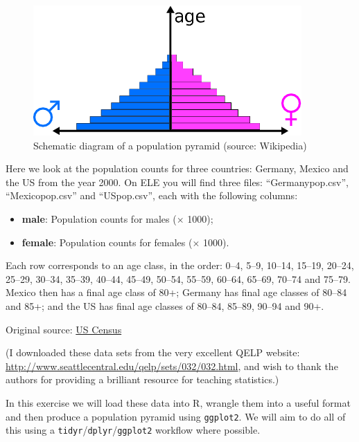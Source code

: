 \documentclass[]{book}
\providecommand{\tightlist}{%
  \setlength{\itemsep}{0pt}\setlength{\parskip}{0pt}}
\theoremstyle{definition}
\theoremstyle{definition}
\theoremstyle{definition}
\theoremstyle{remark}
\begin{document}
\begin{figure}

{\centering \includegraphics{images/Population_pyramid_example} 

}

\caption{Schematic diagram of a population pyramid (source: Wikipedia)}\label{fig:poppyramid}
\end{figure}

Here we look at the population counts for three countries: Germany,
Mexico and the US from the year 2000. On ELE you will find three files:
``Germanypop.csv'', ``Mexicopop.csv'' and ``USpop.csv'', each with the
following columns:

\begin{itemize}
\tightlist
\item
  \textbf{male}: Population counts for males (\(\times\) 1000);
\item
  \textbf{female}: Population counts for females (\(\times\) 1000).
\end{itemize}

Each row corresponds to an age class, in the order: 0--4, 5--9, 10--14,
15--19, 20--24, 25--29, 30--34, 35--39, 40--44, 45--49, 50--54, 55--59,
60--64, 65--69, 70--74 and 75--79. Mexico then has a final age class of
80+; Germany has final age classes of 80--84 and 85+; and the US has
final age classes of 80--84, 85--89, 90--94 and 90+.

Original source: \href{http://www.census.gov/}{US Census}

(I downloaded these data sets from the very excellent QELP website:
\url{http://www.seattlecentral.edu/qelp/sets/032/032.html}, and wish to
thank the authors for providing a brilliant resource for teaching
statistics.)

In this exercise we will load these data into R, wrangle them into a
useful format and then produce a population pyramid using
\texttt{ggplot2}. We will aim to do all of this using a
\texttt{tidyr}/\texttt{dplyr}/\texttt{ggplot2} workflow where possible.
\end{document}
